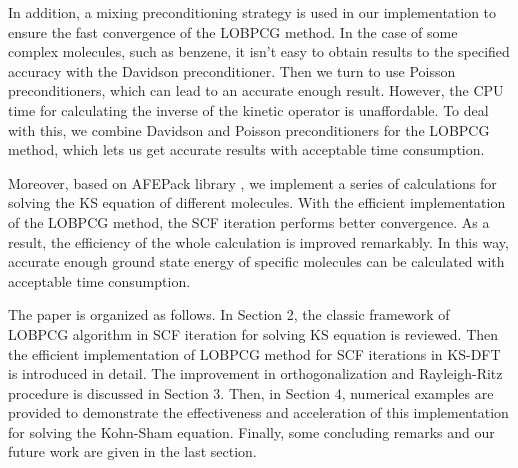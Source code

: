 \documentclass[12pt]{article}
\numberwithin{figure}{section}
\numberwithin{table}{section}
\begin{document}
In addition, a mixing preconditioning strategy is used in our implementation to ensure the fast convergence of the LOBPCG method. In the case of some complex molecules, such as benzene, it isn't easy to obtain results to the specified accuracy with the Davidson preconditioner. Then we turn to use Poisson preconditioners, which can lead to an accurate enough result. However, the CPU time for calculating the inverse of the kinetic operator is unaffordable. To deal with this, we combine Davidson and Poisson preconditioners for the LOBPCG method, which lets us get accurate results with acceptable time consumption. 

Moreover, based on AFEPack library \cite{li2005multi}, we implement a series of calculations for solving the KS equation of different molecules. With the efficient implementation of the LOBPCG method, the SCF iteration performs better convergence. As a result, the efficiency of the whole calculation is improved remarkably. In this way, accurate enough ground state energy of specific molecules can be calculated with acceptable time consumption. 

The paper is organized as follows. In Section 2, the classic framework of LOBPCG algorithm in SCF iteration for solving KS equation is reviewed. Then the efficient implementation of LOBPCG method for SCF iterations in KS-DFT is introduced in detail. The improvement in orthogonalization and Rayleigh-Ritz procedure is discussed in Section 3. Then, in Section 4, numerical examples are provided to demonstrate the effectiveness and acceleration of this implementation for solving the Kohn-Sham equation. Finally, some concluding remarks and our future work are given in the last section.
\end{document}
